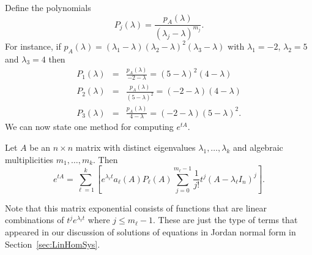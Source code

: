 \documentclass{ximera}
\begin{document}
Define the polynomials 
\begin{equation}  \label{e:Pj}
P_j(\lambda) = \frac{p_A(\lambda)}{(\lambda_j-\lambda)^{m_j}}.
\end{equation}
For instance, if 
$p_A(\lambda)=(\lambda_1-\lambda)(\lambda_2-\lambda)^2(\lambda_3-\lambda)$ 
with $\lambda_1 = -2$, $\lambda_2 = 5$ and $\lambda_3 = 4$ then
\begin{eqnarray*}
P_1(\lambda) &=& \frac{p_A(\lambda)}{-2-\lambda}=(5-\lambda)^2(4-\lambda)\\
P_2(\lambda) &=& \frac{p_A(\lambda)}{(5-\lambda)^2}=(-2-\lambda)(4-\lambda)\\
P_3(\lambda) &=& \frac{p_A(\lambda)}{4-\lambda}=(-2-\lambda)(5-\lambda)^2.
\end{eqnarray*}
We can now state one method for computing $e^{tA}$.
\begin{thm} \label{T:etA}
Let $A$ be an $n\times n$ matrix with distinct eigenvalues 
$\lambda_1,\ldots,\lambda_k$ and algebraic multiplicities $m_1,\ldots,m_k$.  
Then
\[
e^{tA} = \sum_{\ell=1}^k \left[e^{\lambda_\ell t}a_\ell(A)P_\ell(A)
\sum_{j=0}^{m_\ell-1}\frac{1}{j!}t^j(A-\lambda_\ell I_n)^j\right].
\]
\end{thm}

Note that this matrix exponential consists of functions that are linear 
combinations of $t^je^{\lambda_\ell t}$ where $j\leq m_\ell-1$.  These
are just the type of terms that appeared in our discussion of solutions 
of equations in Jordan normal form in Section~\ref{sec:LinHomSys}.
\end{document}
